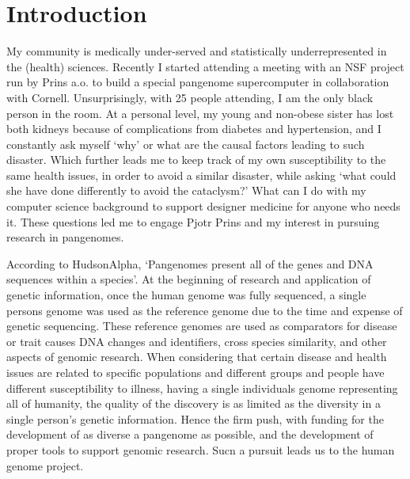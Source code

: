 \section*{Introduction} %


My community is medically under-served and statistically underrepresented in the (health) sciences. 
Recently I started attending a meeting with an NSF project run by Prins a.o. to build a special pangenome supercomputer in collaboration with Cornell. 
Unsurprisingly, with 25 people attending, I am the only black person in the room.
At a personal level, my young and non-obese sister has lost both kidneys because of complications from diabetes and hypertension, and I constantly ask myself `why' or what are the causal factors leading to such disaster.
Which further leads me to keep track of my own susceptibility to the same health issues, in order to avoid a similar disaster, while asking `what could she have done differently to avoid the cataclysm?'
What can I do with my computer science background to support designer medicine for anyone who needs it.  
These questions led me to engage Pjotr Prins and my interest in pursuing research in pangenomes.

According to HudsonAlpha, `Pangenomes present all of the genes and DNA sequences within a species'. 
At the beginning of research and application of genetic information, once the human genome was fully sequenced, a single persons genome was used as the reference genome due to the time and expense of genetic sequencing.
These reference genomes are used as comparators for disease or trait causes DNA changes and identifiers, cross species similarity, and other aspects of genomic research.
When considering that certain disease and health issues are related to specific populations and different groups and people have different susceptibility to illness, having a single individuals genome representing all of humanity, the quality of the discovery is as limited as the diversity in a single person's genetic information.
Hence the firm push, with funding for the development of as diverse a pangenome as possible, and the development of proper tools to support genomic research. 
Sucn a pursuit leads us to the human genome project.


